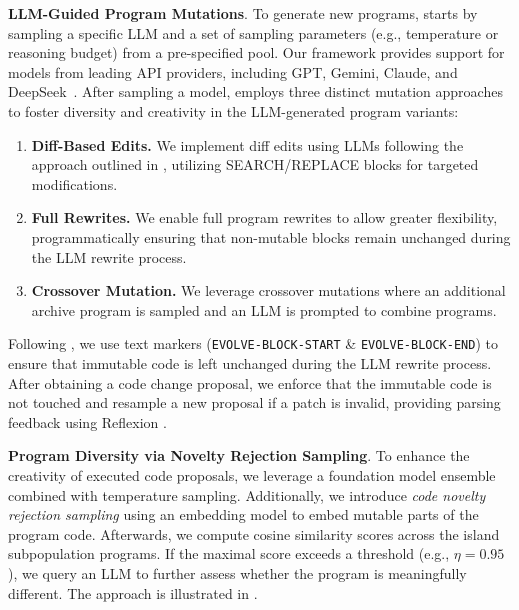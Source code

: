 \textbf{LLM-Guided Program Mutations}.  To generate new programs, \ouralgo starts by sampling a specific LLM and a set of sampling parameters (e.g., temperature or reasoning budget) from a pre-specified pool. Our framework provides support for models from leading API providers, including GPT, Gemini, Claude, and DeepSeek~\citep{gpt4, moe_gemini25, claude3, guo2025deepseek}. After sampling a model, \ouralgo employs three distinct mutation approaches to foster diversity and creativity in the LLM-generated program variants: 
%
\begin{enumerate}
\item \textbf{Diff-Based Edits.} We implement diff edits using LLMs following the approach outlined in \citet{novikov2025alphaevolve}, utilizing SEARCH/REPLACE blocks for targeted modifications.
\item \textbf{Full Rewrites.} We enable full program rewrites to allow greater flexibility, programmatically ensuring that non-mutable blocks remain unchanged during the LLM rewrite process. 
\item \textbf{Crossover Mutation.} We leverage crossover mutations \citep{lehman2022evolutionlargemodels,lange2025ai} where an additional archive program is sampled and an LLM is prompted to combine programs.
\end{enumerate}
%

Following \citet{novikov2025alphaevolve}, we use text markers (\texttt{EVOLVE-BLOCK-START} \& \texttt{EVOLVE-BLOCK-END}) to ensure that immutable code is left unchanged during the LLM rewrite process. After obtaining a code change proposal, we enforce that the immutable code is not touched and resample a new proposal if a patch is invalid, providing parsing feedback using Reflexion \citep{shinn2024reflexion}. 

\textbf{Program Diversity via Novelty Rejection Sampling}. To enhance the creativity of executed code proposals, we leverage a foundation model ensemble combined with temperature sampling. Additionally, we introduce \textit{code novelty rejection sampling} using an embedding model to embed mutable parts of the program code. Afterwards, we compute cosine similarity scores across the island subpopulation programs. If the maximal score exceeds a threshold (e.g., $\eta=0.95$), we query an LLM to further assess whether the program is meaningfully different. The approach is illustrated in .

